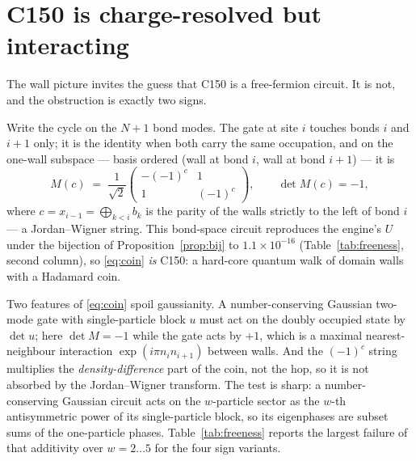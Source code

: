 \documentclass[11pt]{article}
\theoremstyle{plain}
\theoremstyle{definition}
\begin{document}
\section{C150 is charge-resolved but interacting}
\label{sec:free}

The wall picture invites the guess that C150 is a free-fermion circuit. It is
not, and the obstruction is exactly two signs.

Write the cycle on the $N+1$ bond modes. The gate at site $i$ touches bonds $i$
and $i+1$ only; it is the identity when both carry the same occupation, and on
the one-wall subspace --- basis ordered (wall at bond $i$, wall at bond $i+1$) ---
it is
\begin{equation}
  M(c) \;=\; \frac{1}{\sqrt2}
  \begin{pmatrix} -(-1)^c & 1 \\ 1 & (-1)^c \end{pmatrix},
  \qquad \det M(c) = -1 ,
  \label{eq:coin}
\end{equation}
where $c = x_{i-1} = \bigoplus_{k<i} b_k$ is the parity of the walls strictly to
the left of bond $i$ --- a Jordan--Wigner string. This bond-space circuit
reproduces the engine's $U$ under the bijection of Proposition~\ref{prop:bij} to
$1.1\times10^{-16}$ (Table~\ref{tab:freeness}, second column), so
\eqref{eq:coin} \emph{is} C150: a hard-core quantum walk of domain walls with a
Hadamard coin.

Two features of \eqref{eq:coin} spoil gaussianity. A number-conserving Gaussian
two-mode gate with single-particle block $u$ must act on the doubly occupied
state by $\det u$; here $\det M = -1$ while the gate acts by $+1$, which is a
maximal nearest-neighbour interaction $\exp(i\pi n_i n_{i+1})$ between walls. And
the $(-1)^c$ string multiplies the \emph{density-difference} part of the coin,
not the hop, so it is not absorbed by the Jordan--Wigner transform. The test is
sharp: a number-conserving Gaussian circuit acts on the $w$-particle sector as
the $w$-th antisymmetric power of its single-particle block, so its eigenphases
are subset sums of the one-particle phases. Table~\ref{tab:freeness} reports the
largest failure of that additivity over $w=2\ldots5$ for the four sign variants.

\begin{table}[htbp]
\centering\footnotesize

\caption{Additivity defect: the largest $|\arg(\lambda/\lambda')|$ in radians
between the $w$-wall spectrum and the $w$-fold products of the one-wall
eigenvalues, maximised over $w=2\ldots5$ (compared as points on the unit circle,
so the branch cut cannot masquerade as a defect). Column 2 is the bond
representation checked against the engine. C150 (column 3) and each of the two
single-defect models (columns 4, 5) are non-additive at $0.43$--$1.87$~rad;
removing \emph{both} defects gives the Gaussian reference (column 6), additive to
$4\times10^{-15}$.}
\label{tab:freeness}
\end{table}
\end{document}
